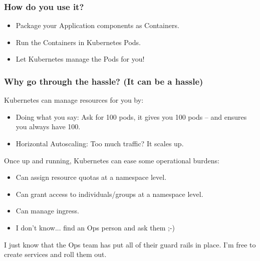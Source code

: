     \begin{frame}
        \frametitle{How do you use it?}
        \begin{itemize}
            \item{Package your Application components as Containers.}\pause
            \item{Run the Containers in Kubernetes Pods.}\pause
            \item{Let Kubernetes manage the Pods for you!}
        \end{itemize}
    \end{frame}

    \begin{frame}
        \frametitle{Why go through the hassle? (It can be a hassle)}
        Kubernetes can manage resources for you by:\pause
        \begin{itemize}
            \item{Doing what you say: Ask for 100 pods, it gives you 100 pods -- and ensures you always have 100.}\pause
            \item{Horizontal Autoscaling: Too much traffic? It scales up.}\pause
        \end{itemize}
        Once up and running, Kubernetes can ease some operational burdens:\pause
        \begin{itemize}
            \item{Can assign resource quotas at a namespace level.}\pause
            \item{Can grant access to individuals/groups at a namespace level.}\pause
            \item{Can manage ingress.}\pause
            \item{I don't know... find an Ops person and ask them ;-)}\pause
        \end{itemize}
        I just know that the Ops team has put all of their guard rails in place.
        I'm free to create services and roll them out.
    \end{frame}

